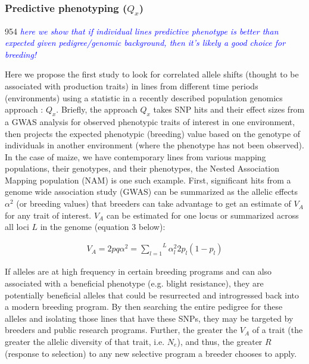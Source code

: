 \documentclass[12pt]{article}
\newcommand{\jri}[1]{\textcolor{blue}{ \emph{\scriptsize  #1}} }
\begin{document}
\subsubsection*{Predictive phenotyping ($Q_{x}$)}954
\jri{here we show that if individual lines predictive phenotype is better than expected given pedigree/genomic background, then it's likely a good choice for breeding! }

Here we propose the first study to look for correlated allele shifts (thought to be associated with production traits) in lines from different time periods (environments) using a statistic in a recently described population genomics approach \cite{Berg:2014bs}: $Q_{x}$. 
Briefly, the approach $Q_{x}$ takes SNP hits and their effect sizes from a GWAS analysis for observed phenotypic traits of interest in one environment, then projects the expected phenotypic (breeding) value based on the genotype of individuals in another environment (where the phenotype has not been observed). 
In the case of maize, we have contemporary lines from various mapping populations, their genotypes, and their phenotypes, the Nested Association Mapping population (NAM) \CITE{} is one such example.   
First, significant hits from a genome wide association study (GWAS)  can be summarized as the allelic effects $\alpha^{2}$ (or breeding values) that breeders can take advantage to get an estimate of $V_{A}$ for any trait of interest. $V_{A}$ can be estimated for one locus or summarized across all loci $L$ in the genome (equation 3 below):

  \begin{align}
    V_A = 2pq\alpha^2
     = \overset{L}{\underset{l=1}{\sum}}\alpha^2_l2p_l(1-p_l)
  \end{align}

If alleles are at high frequency in certain breeding programs and can also associated with a beneficial phenotype (e.g. blight resistance), they are potentially beneficial alleles that could be resurrected and introgressed back into a modern breeding program. 
By then searching the entire pedigree for these alleles and isolating those lines that have these SNPs, they may be targeted by breeders and public research programs.
Further, the greater the $V_A$ of a trait (the greater the allelic diversity of that trait, i.e. $N_{e}$), and thus, the greater $R$ (response to selection) to any new selective program a breeder chooses to apply.
\end{document}
